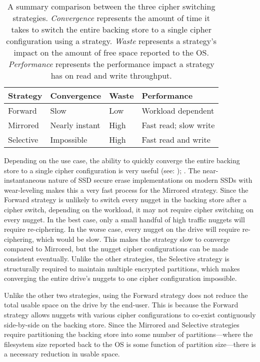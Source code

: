 \begin{table}[]
   \begin{tabular}{@{}llll@{}}
   \toprule
   \textbf{Strategy} & \textbf{Convergence} & \textbf{Waste} & \textbf{Performance} \\ \midrule
   Forward   & Slow           & Low  & Workload dependent    \\
   Mirrored  & Nearly instant & High & Fast read; slow write \\
   Selective & Impossible     & High & Fast read and write   \\
   \end{tabular}
   \caption{A summary comparison between the three cipher switching strategies.
   \emph{Convergence} represents the amount of time it takes to switch the
   entire backing store to a single cipher configuration using a strategy.
   \emph{Waste} represents a strategy's impact on the amount of free space
   reported to the OS. \emph{Performance} represents the performance impact a
   strategy has on read and write throughput.}
   \label{tbl:strategies-advantages}
\end{table}


Depending on the use case, the ability to quickly converge the entire backing
store to a single cipher configuration is very useful (see: );
. The near-instantaneous nature of SSD secure erase implementations on
modern SSDs with wear-leveling makes this a very fast process for the Mirrored
strategy. Since the Forward strategy is unlikely to switch every nugget in the
backing store after a cipher switch, depending on the workload, it may not
require cipher switching on every nugget. In the best case, only a small handful
of high traffic nuggets will require re-ciphering. In the worse case, every
nugget on the drive will require re-ciphering, which would be slow. This makes
the strategy slow to converge compared to Mirrored, but the nugget cipher
configurations can be made consistent eventually. Unlike the other strategies,
the Selective strategy is structurally required to maintain multiple encrypted
partitions, which makes converging the entire drive's nuggets to one cipher
configuration impossible.

Unlike the other two strategies, using the Forward strategy does not reduce the
total usable space on the drive by the end-user. This is because the Forward
strategy allows nuggets with various cipher configurations to co-exist
contiguously side-by-side on the backing store. Since the Mirrored and Selective
strategies require partitioning the backing store into some number of
partitions---where the filesystem size reported back to the OS is some function
of partition size---there is a necessary reduction in usable space.

